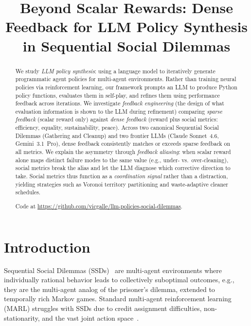 \documentclass{nextgame2026} %
\title[Beyond Scalar Rewards: Dense Feedback for LLM Policy Synthesis in Social Dilemmas]{Beyond Scalar Rewards: Dense Feedback for LLM Policy Synthesis in Sequential Social Dilemmas}
\begin{document}
\maketitle

\begin{abstract}%
We study \emph{LLM policy synthesis}: using a language model to
iteratively generate programmatic agent policies for multi-agent
environments.  Rather than training neural policies via reinforcement
learning, our framework prompts an LLM to produce Python policy functions,
evaluates them in self-play, and refines them using performance feedback
across iterations.  We investigate \emph{feedback engineering} (the design
of what evaluation information is shown to the LLM during
refinement) comparing \emph{sparse feedback} (scalar reward only) against
\emph{dense feedback} (reward plus social metrics: efficiency, equality,
sustainability, peace).
Across two canonical Sequential Social Dilemmas (Gathering and
Cleanup) and two frontier LLMs (Claude Sonnet~4.6, Gemini~3.1~Pro),
dense feedback consistently matches or exceeds sparse feedback on all
metrics. We explain the asymmetry through \emph{feedback aliasing}: when
scalar reward alone maps distinct failure modes to the same value (e.g.,
under- vs.\ over-cleaning), social metrics break the alias and let the LLM
diagnose which corrective direction to take.  Social metrics thus function as a \emph{coordination signal} rather than a distraction, yielding strategies
such as Voronoi territory partitioning and waste-adaptive cleaner
schedules.

\noindent Code at \url{https://github.com/vicgalle/llm-policies-social-dilemmas}.\end{abstract}


\section{Introduction}
\label{sec:intro}

Sequential Social Dilemmas (SSDs)~\citep{leibo2017multi} are multi-agent
environments where individually rational behavior leads to collectively
suboptimal outcomes, e.g., they are the multi-agent analog of the prisoner's dilemma,
extended to temporally rich Markov games.  Standard multi-agent
reinforcement learning (MARL) struggles with SSDs due to credit assignment
difficulties, non-stationarity, and the vast joint action
space~\citep{busoniu2008comprehensive}.
\end{document}
